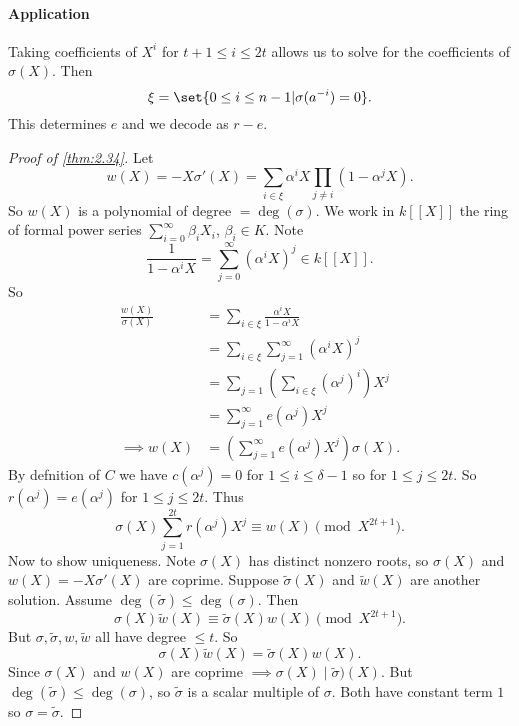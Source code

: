 \documentclass{article}
\newcommand{\1}[1]{\mathbbm{1}_{#1}}
\begin{document}
\paragraph{Application}
Taking coefficients of $X^i$ for $t+1 \leq i \leq 2t$ allows us to solve for the coefficients of $\sigma(X)$. Then
\begin{equation*}
    \xi = \set{0 \leq i \leq n-1 | \sigma(a^{-i}) = 0}.
\end{equation*}
This determines $e$ and we decode as $r-e$.
\begin{proof}[Proof of \cref{thm:2.34}]
    Let
    \begin{equation*}
        w(X) = -X \sigma'(X) = \sum_{i \in \xi} \alpha^i X \prod_{j \neq i} (1 - \alpha^j X).
    \end{equation*}
    So $w(X)$ is a polynomial of degree $=\deg(\sigma)$.
    We work in $k[[X]]$ the ring of formal power series $\sum_{i=0}^\infty \beta_i X_i$, $\beta_i \in K$.
    Note
    \begin{equation*}
        \frac{1}{1 - \alpha^i X} = \sum_{j=0}^\infty (\alpha^i X)^j \in k[[X]].
    \end{equation*}
    So
    \begin{align*}
        \frac{w(X)}{\sigma(X)} &= \sum_{i \in \xi} \frac{\alpha^i X}{1 - \alpha^i X} \\
                               &= \sum_{i \in \xi} \sum_{j=1}^\infty (\alpha^i X)^j \\
                               &= \sum_{j=1} \left(\sum_{i\in \xi} (\alpha^j)^i\right) X^j \\
                               &= \sum_{j=1}^\infty e(\alpha^j) X^j \\
        \implies w(X) &= \left(\sum_{j=1}^\infty e(\alpha^j) X^j \right) \sigma(X).
    \end{align*}
    By defnition of $C$ we have $c(\alpha^j) = 0$ for $1 \leq i \leq \delta-1$ so for $1 \leq j \leq 2t$.
    So $r(\alpha^j) = e(\alpha^j)$ for $1 \leq j \leq 2t$.  Thus
    \begin{equation*}
        \sigma(X) \sum_{j=1}^{2t} r(\alpha^j) X^j \equiv w(X) \pmod{X^{2t+1}}.
    \end{equation*}
    Now to show uniqueness.
    Note $\sigma(X)$ has distinct nonzero roots, so $\sigma(X)$ and $w(X) = -X \sigma'(X)$ are coprime.
    Suppose $\tilde{\sigma}(X)$ and $\tilde{w}(X)$ are another solution.
    Assume $\deg(\tilde{\sigma}) \leq \deg(\sigma)$. Then
    \begin{equation*}
        \sigma(X) \tilde{w}(X) \equiv \tilde{\sigma}(X) w(X) \pmod{X^{2t+1}}.
    \end{equation*}
    But $\sigma, \tilde{\sigma}, w, \tilde{w}$ all have degree $\leq t$. So
    \begin{equation*}
        \sigma(X) \tilde{w}(X) = \tilde{\sigma}(X) w(X).
    \end{equation*}
    Since $\sigma(X)$ and $w(X)$ are coprime $\implies \sigma(X) \mid \tilde{\sigma})(X)$.
    But $\deg(\tilde{\sigma}) \leq \deg(\sigma)$, so $\tilde{\sigma}$ is a scalar multiple of $\sigma$.
    Both have constant term $1$ so $\sigma = \tilde{\sigma}$.
\end{proof}
\end{document}
